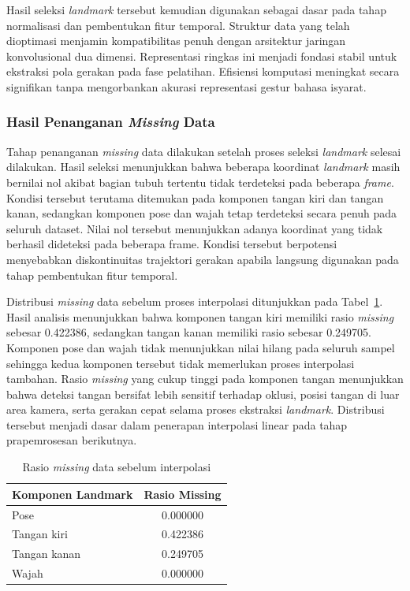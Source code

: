 Hasil seleksi \textit{landmark} tersebut kemudian digunakan sebagai dasar pada tahap normalisasi dan pembentukan fitur temporal. 
Struktur data yang telah dioptimasi menjamin kompatibilitas penuh dengan arsitektur jaringan konvolusional dua dimensi. 
Representasi ringkas ini menjadi fondasi stabil untuk ekstraksi pola gerakan pada fase pelatihan. 
Efisiensi komputasi meningkat secara signifikan tanpa mengorbankan akurasi representasi gestur bahasa isyarat.

\subsubsection{Hasil Penanganan \textit{Missing} Data}
\label{subsubsec:hasil-missing-data}
Tahap penanganan \textit{missing} data dilakukan setelah proses seleksi \textit{landmark} selesai dilakukan. 
Hasil seleksi menunjukkan bahwa beberapa koordinat \textit{landmark} masih bernilai nol akibat bagian tubuh tertentu tidak terdeteksi pada beberapa \textit{frame}. 
Kondisi tersebut terutama ditemukan pada komponen tangan kiri dan tangan kanan, sedangkan komponen pose dan wajah tetap terdeteksi secara penuh pada seluruh dataset. 
Nilai nol tersebut menunjukkan adanya koordinat yang tidak berhasil dideteksi pada beberapa frame.
Kondisi tersebut berpotensi menyebabkan diskontinuitas trajektori gerakan apabila langsung digunakan pada tahap pembentukan fitur temporal.

Distribusi \textit{missing} data sebelum proses interpolasi ditunjukkan pada Tabel~\ref{tab:4-missing-before}. 
Hasil analisis menunjukkan bahwa komponen tangan kiri memiliki rasio \textit{missing} sebesar 0.422386, sedangkan tangan kanan memiliki rasio sebesar 0.249705. 
Komponen pose dan wajah tidak menunjukkan nilai hilang pada seluruh sampel sehingga kedua komponen tersebut tidak memerlukan proses interpolasi tambahan. 
Rasio \textit{missing} yang cukup tinggi pada komponen tangan menunjukkan bahwa deteksi tangan bersifat lebih sensitif terhadap oklusi, posisi tangan di luar area kamera, serta gerakan cepat selama proses ekstraksi \textit{landmark}. 
Distribusi tersebut menjadi dasar dalam penerapan interpolasi linear pada tahap prapemrosesan berikutnya.

\begin{table}[H]
\centering
\caption{Rasio \textit{missing} data sebelum interpolasi}
\label{tab:4-missing-before}
\begin{tabular}{|l|c|}
\hline
\textbf{Komponen Landmark} & \textbf{Rasio Missing} \\ \hline
Pose & 0.000000 \\ \hline
Tangan kiri & 0.422386 \\ \hline
Tangan kanan & 0.249705 \\ \hline
Wajah & 0.000000 \\ \hline
\end{tabular}
\end{table}

